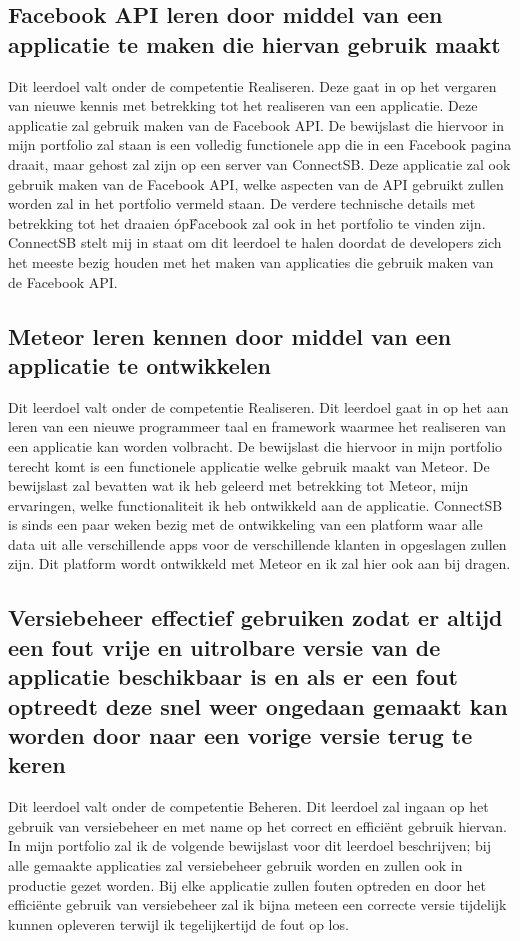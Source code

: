\documentclass{article}
\begin{document}
\subsection{Facebook API leren door middel van een applicatie te maken die hiervan gebruik maakt}
Dit leerdoel valt onder de competentie Realiseren. Deze gaat in op het vergaren van nieuwe kennis met betrekking tot het realiseren van een applicatie. Deze applicatie zal gebruik maken van de Facebook API. De bewijslast die hiervoor in mijn portfolio zal staan is een volledig functionele app die in een Facebook pagina draait, maar gehost zal zijn op een server van ConnectSB. Deze applicatie zal ook gebruik maken van de Facebook API, welke aspecten van de API gebruikt zullen worden zal in het portfolio vermeld staan. De verdere technische details met betrekking tot het draaien \'op\' Facebook zal ook in het portfolio te vinden zijn. ConnectSB stelt mij in staat om dit leerdoel te halen doordat de developers zich het meeste bezig houden met het maken van applicaties die gebruik maken van de Facebook API.

\subsection{Meteor leren kennen door middel van een applicatie te ontwikkelen}
Dit leerdoel valt onder de competentie Realiseren. Dit leerdoel gaat in op het aan leren van een nieuwe programmeer taal en framework waarmee het realiseren van een applicatie kan worden volbracht. De bewijslast die hiervoor in mijn portfolio terecht komt is een functionele applicatie welke gebruik maakt van Meteor. De bewijslast zal bevatten wat ik heb geleerd met betrekking tot Meteor, mijn ervaringen, welke functionaliteit ik heb ontwikkeld aan de applicatie. ConnectSB is sinds een paar weken bezig met de ontwikkeling van een platform waar alle data uit alle verschillende apps voor de verschillende klanten in opgeslagen zullen zijn. Dit platform wordt ontwikkeld met Meteor en ik zal hier ook aan bij dragen.

\subsection{Versiebeheer effectief gebruiken zodat er altijd een fout vrije en uitrolbare versie van de applicatie beschikbaar is en als er een fout optreedt deze snel weer ongedaan gemaakt kan worden door naar een vorige versie terug te keren}
Dit leerdoel valt onder de competentie Beheren. Dit leerdoel zal ingaan op het gebruik van versiebeheer en met name op het correct en efficiënt gebruik hiervan. In mijn portfolio zal ik de volgende bewijslast voor dit leerdoel beschrijven; bij alle gemaakte applicaties zal versiebeheer gebruik worden en zullen ook in productie gezet worden. Bij elke applicatie zullen fouten optreden en door het efficiënte gebruik van versiebeheer zal ik bijna meteen een correcte versie tijdelijk kunnen opleveren terwijl ik tegelijkertijd de fout op los.

\end{document}
